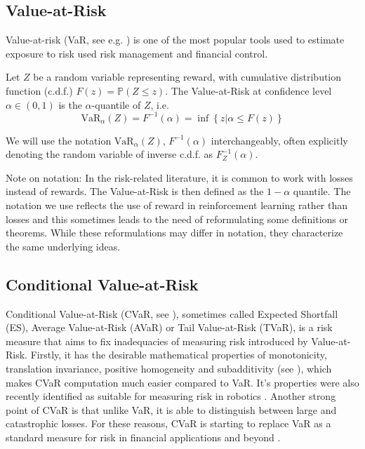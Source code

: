 \subsection{Value-at-Risk}

Value-at-risk (VaR, see e.g. \citet{wipplinger2007philippe}) is one of the most popular tools used to estimate exposure to risk used risk management and financial control.

Let $Z$ be a random variable representing reward, with cumulative distribution function (c.d.f.) $F(z) = \mathbb{P}(Z \le z)$.
The Value-at-Risk  at confidence level $\alpha \in (0,1)$ is the $\alpha$-quantile of $Z$, i.e. 
\begin{equation}
\text{VaR}_\alpha(Z)=F^{-1}(\alpha)=\inf\left\lbrace z | \alpha \le F(z) \right\rbrace
\end{equation}

We will use the notation $\text{VaR}_\alpha(Z)$, $F^{-1}(\alpha)$ interchangeably, often explicitly denoting the random variable of inverse c.d.f. as $F^{-1}_Z(\alpha)$.

Note on notation: In the risk-related literature, it is common to work with losses instead of rewards. The Value-at-Risk is then defined as the $1-\alpha$ quantile. The notation we use reflects the use of reward in reinforcement learning rather than losses and this sometimes leads to the need of reformulating some definitions or theorems. While these reformulations may differ in notation, they characterize the same underlying ideas.

\subsection{Conditional Value-at-Risk}

Conditional Value-at-Risk (CVaR, see \citet{rockafellar2000optimization,rockafellar2002conditional}), sometimes called Expected Shortfall (ES), Average Value-at-Risk (AVaR) or Tail Value-at-Risk (TVaR), is a risk measure that aims to fix inadequacies of measuring risk introduced by Value-at-Risk. Firstly, it has the desirable mathematical properties of monotonicity, translation invariance, positive homogeneity and subadditivity (see \citet{artzner1999coherent}), which makes CVaR computation much easier compared to VaR. It's properties were also recently identified as suitable for measuring risk in robotics \cite{majumdar2017should}. Another strong point of CVaR is that unlike VaR, it is able to distinguish between large and catastrophic losses. For these reasons, CVaR is starting to replace VaR as a standard measure for risk in financial applications \citep{basel2013fundamental} and beyond \cite{something}.

